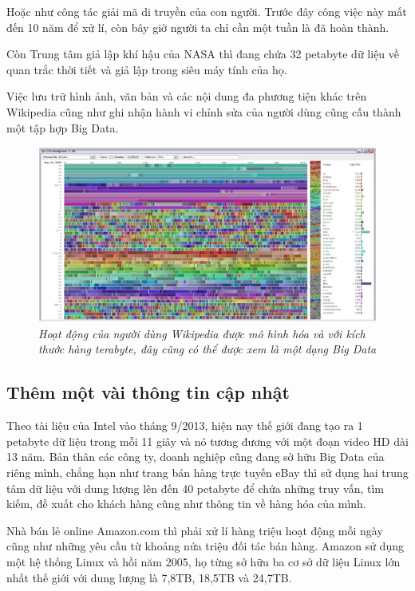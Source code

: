 \documentclass[12pt]{report}
\begin{document}
Hoặc như công tác giải mã di truyền của con người. Trước đây công việc này mất đến 10 năm để xử lí, còn bây giờ người ta chỉ cần một tuần là đã hoàn thành. 

Còn Trung tâm giả lập khí hậu của NASA thì đang chứa 32 petabyte dữ liệu về quan trắc thời tiết và giả lập trong siêu máy tính của họ.

Việc lưu trữ hình ảnh, văn bản và các nội dung đa phương tiện khác trên Wikipedia cũng như ghi nhận hành vi chỉnh sửa của người dùng cũng cấu thành một tập hợp Big Data.

\begin{figure}[H]
\centering
\includegraphics[scale=1]{wiki.png}
\caption{\it Hoạt động của người dùng Wikipedia được mô hình hóa và với kích thước hàng terabyte, đây cũng có thể được xem là một dạng Big Data}
\end{figure}

\subsection{Thêm một vài thông tin cập nhật}
Theo tài liệu của Intel vào tháng 9/2013, hiện nay thế giới đang tạo ra 1 petabyte dữ liệu trong mỗi 11 giây và nó tương đương với một đoạn video HD dài 13 năm. Bản thân các công ty, doanh nghiệp cũng đang sở hữu Big Data của riêng mình, chẳng hạn như trang bán hàng trực tuyến eBay thì sử dụng hai trung tâm dữ liệu với dung lượng lên đến 40 petabyte để chứa những truy vấn, tìm kiếm, đề xuất cho khách hàng cũng như thông tin về hàng hóa của mình.

Nhà bán lẻ online Amazon.com thì phải xử lí hàng triệu hoạt động mỗi ngày cũng như những yêu cầu từ khoảng nửa triệu đối tác bán hàng. Amazon sử dụng một hệ thống Linux và hồi năm 2005, họ từng sở hữu ba cơ sở dữ liệu Linux lớn nhất thế giới với dung lượng là 7,8TB, 18,5TB và 24,7TB. 
\end{document}
